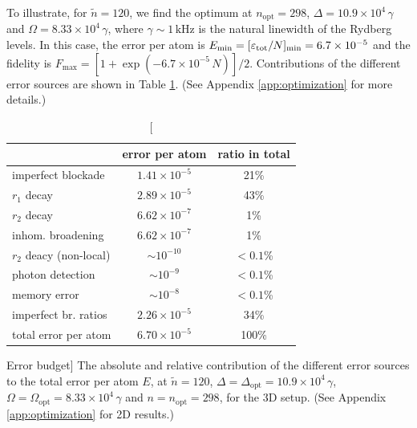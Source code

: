 To illustrate, for $\tilde n = 120$, we find the optimum at $n_\mathrm{opt} =
298$, $\Delta = 10.9\times 10^4 \,\gamma$ and $\Omega = 8.33\times
10^4\,\gamma$, where $\gamma \sim 1\,\mathrm{kHz}$ is the natural linewidth of the
Rydberg levels. In this case, the error per atom is $E_\mathrm{min}=
[\varepsilon_\mathrm{tot}/N]_\mathrm{min} = 6.7\times 10^{-5}$ and the fidelity is
$F_\mathrm{max} = [1 + \exp(-6.7\times 10^{-5}\,N)]/2$.
Contributions of the different error sources are shown in Table
\ref{table:errors}. (See Appendix \ref{app:optimization} for more details.)
\begin{table}
\centering
\begin{tabular}{|l|c|c|}
\hline
 & error per atom & ratio in total\\
\hline
imperfect blockade & $1.41 \times 10^{-5}$ & 21\%\\
$r_1$ decay & $2.89 \times 10^{-5}$ & 43\%\\
$r_2$ decay & $6.62 \times 10^{-7}$ & 1\%\\
inhom. broadening & $6.62 \times 10^{-7}$ & 1\%\\
$r_2$ deacy (non-local) & $ \sim 10^{-10}$ & $<0.1$\%\\
photon detection & $ \sim 10^{-9}$ & $<0.1$\%\\
memory error & $ \sim 10^{-8}$ & $<0.1$\%\\
imperfect br. ratios & $2.26 \times 10^{-5}$ & 34\%\\
\hline
total error per atom & $6.70 \times 10^{-5}$ & 100\%\\
\hline
\end{tabular}
\caption
[Error budget]{
\label{table:errors}
The absolute and relative contribution of the different error sources to the
total error per atom $E$, at $\tilde n = 120$, $\Delta =
\Delta_\mathrm{opt} = 10.9\times 10^4\,\gamma$, $\Omega = \Omega_\mathrm{opt} = 
8.33\times 10^4\,\gamma$ and $n = n_\mathrm{opt} = 298$, for the 3D setup. (See
Appendix \ref{app:optimization} for 2D results.)}
\end{table}

